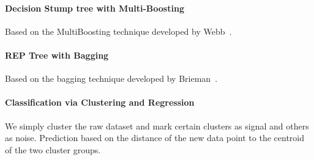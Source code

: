 \paragraph{Decision Stump tree with Multi-Boosting}

Based on the MultiBoosting technique developed by Webb~\cite{MultiBoosting}.

\paragraph{REP Tree with Bagging}

Based on the bagging technique developed by Brieman~\cite{Bagging}.

\paragraph{Classification via Clustering and Regression}

We simply cluster the raw dataset and mark certain clusters as signal and others as noise. Prediction based on the distance of the new data point to the centroid of the two cluster groups. 
